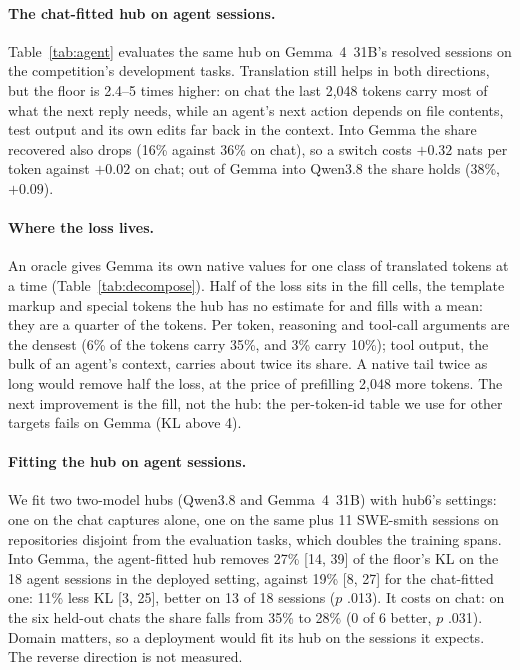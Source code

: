 \documentclass[11pt]{article}
\begin{document}
\paragraph{The chat-fitted hub on agent sessions.} Table~\ref{tab:agent} evaluates the same hub on Gemma~4~31B's
resolved sessions on the competition's development tasks. Translation still helps in both directions, but the floor
is 2.4--5 times higher: on chat the last 2,048 tokens carry most of what the next reply needs, while an agent's next
action depends on file contents, test output and its own edits far back in the context. Into Gemma the share
recovered also drops (16\% against 36\% on chat), so a switch costs $+0.32$ nats per token against $+0.02$ on chat;
out of Gemma into Qwen3.8 the share holds (38\%, $+0.09$).

\paragraph{Where the loss lives.} An oracle gives Gemma its own native values for one class of translated tokens
at a time (Table~\ref{tab:decompose}). Half of the loss sits in
the fill cells, the template markup and special tokens the hub has no estimate for and fills with a mean: they are a
quarter of the tokens. Per token, reasoning and tool-call arguments are the densest (6\% of the tokens carry
35\%, and 3\% carry 10\%); tool output, the bulk of an agent's context, carries about twice its share. A native
tail twice as long would remove half the loss, at the price of prefilling 2,048 more tokens. The next
improvement is the fill, not the hub: the per-token-id table we use for other targets fails on Gemma (KL above 4).

\paragraph{Fitting the hub on agent sessions.} We fit two two-model hubs (Qwen3.8 and Gemma~4~31B) with hub6's
settings: one on the chat captures alone, one on the same plus 11 SWE-smith sessions on repositories disjoint from the
evaluation tasks, which doubles the training spans.
Into Gemma, the agent-fitted hub removes 27\% [14, 39] of the floor's KL on the 18 agent sessions in the deployed
setting, against 19\% [8, 27] for the chat-fitted one: 11\% less KL [3, 25], better on 13 of 18 sessions ($p$ .013).
It costs on chat: on the six held-out chats the share falls from 35\% to 28\% (0 of 6 better, $p$ .031). Domain
matters, so a deployment would fit its hub on the sessions it expects. The reverse direction is not measured.
\end{document}
